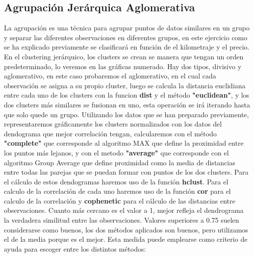 \documentclass[a4paper]{article}
\begin{document}
\subsection{Agrupación Jerárquica Aglomerativa}
La agrupación es una técnica para agrupar puntos de datos similares en un grupo y separar las diferentes observaciones en diferentes grupos, en este ejercicio como se ha explicado previamente se clasificará en función de el kilometraje y el precio. En el clustering jerárquico, los clusters se crean se manera que tengan un orden predeterminado, lo veremos en las gráficas numerado. Hay dos tipos, divisivo y aglomerativo, en este caso probaremos el aglomerativo, en el cual cada observación se asigna a su propio cluster, luego se calcula la distancia euclidiana entre cada uno de los clusters con la funcion \textbf{dist} y el método \textbf{"euclidean"}, y los dos clusters más similares se fusionan en uno, esta operación se irá iterando hasta que solo quede un grupo. Utilizando los datos que se han preparado previamente, representaremos gráficamente los clusters normalizados con los datos del dendograma que mejor correlación tengan, calcularemos con el método \textbf{"complete"} que corresponde al algoritmo MAX que define la proximidad entre los puntos más lejanos, y con el metodo \textbf{"average"} que corresponde con el algoritmo Group Average que define proximidad como la media de distancias entre todas las parejas que se puedan formar con puntos de los dos clusters. Para el cálculo de estos dendogramas haremos uso de la función \textbf{hclust}. Para el calculo de la correlación de cada uno haremos uso de la función \textbf{cor} para el calculo de la correlación y \textbf{cophenetic} para el cálculo de las distancias entre observaciones. Cuanto más cercano es el valor a 1, mejor refleja el dendrograma la verdadera similitud entre las observaciones. Valores superiores a 0.75 suelen considerarse como buenos, los dos métodos aplicados son buenos, pero utilizamos el de la media porque es el mejor. Esta medida puede emplearse como criterio de ayuda para escoger entre los distintos métodos:
\end{document}
